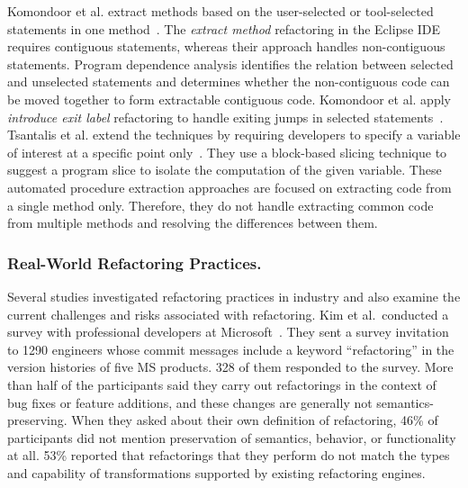 
Komondoor et al.\/ extract methods based on the user-selected or tool-selected statements in one method~\cite{Komondoor2000, Komondoor2003}. The {\em extract method} refactoring in the Eclipse IDE requires contiguous statements, whereas their approach handles non-contiguous statements. Program dependence analysis identifies the relation between selected and unselected statements and determines whether the non-contiguous code can be moved together to form extractable contiguous code. Komondoor et al.\/ apply {\em introduce exit label} refactoring to handle exiting jumps in selected statements~\cite{Komondoor2003}. Tsantalis et al.\/ extend the techniques by requiring developers to specify a variable of interest at a specific point only~\cite{tsantalis2011identification}. They use a block-based slicing technique to suggest a program slice to isolate the computation of the given variable. These automated procedure extraction approaches are focused on extracting code from a single method only. Therefore, they do not handle extracting common code from multiple methods and resolving the differences between them. 

\subsubsection{Real-World Refactoring Practices.} 
\label{sec:refactoringpractice} 

Several studies investigated refactoring practices in industry and also examine the current challenges and risks associated with refactoring. Kim et al.~conducted a survey with professional developers at Microsoft~\cite{Kim2012:FSR, Kim2014:EmpiricalStudy}. They sent a survey invitation to 1290 engineers whose commit messages include a keyword ``refactoring'' in the version histories of five MS products. 328 of them responded to the survey. More than half of the participants said they carry out refactorings in the context of bug fixes or feature additions, and these changes are generally not semantics-preserving. When they asked about their own definition of refactoring, 46\% of participants did not mention preservation of semantics, behavior, or functionality at all. 53\% reported that refactorings that they perform do not match the types and capability of transformations supported by existing refactoring engines. 

